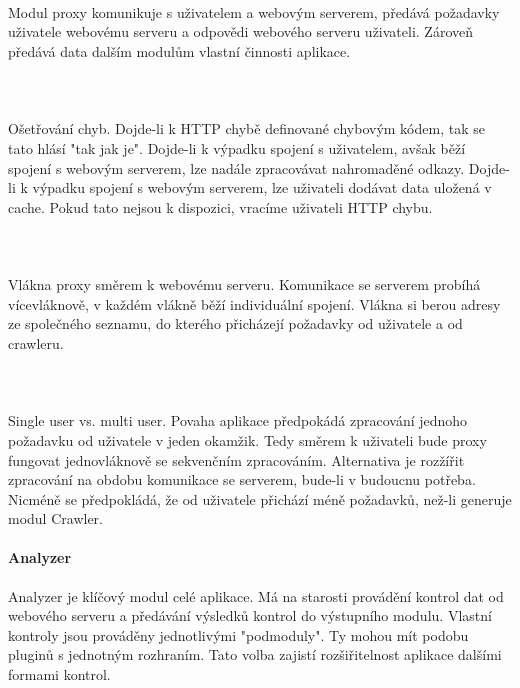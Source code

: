 \documentclass[10pt]{article}
\begin{document}
\paragraph{~} Modul proxy komunikuje s uživatelem a webovým  serverem, předává požadavky uživatele webovému serveru a odpovědi webového serveru uživateli. Zároveň předává data dalším modulům vlastní činnosti aplikace.
\paragraph{~}Ošetřování chyb. Dojde-li k HTTP chybě definované chybovým kódem, tak se tato hlásí "tak jak je". Dojde-li k výpadku spojení s uživatelem, avšak běží spojení s webovým serverem, lze nadále zpracovávat nahromaděné odkazy. Dojde-li k výpadku spojení s webovým serverem, lze uživateli dodávat data uložená v cache. Pokud tato nejsou k dispozici, vracíme uživateli HTTP chybu.
\paragraph{~}Vlákna proxy směrem k webovému serveru. Komunikace se serverem prob\'ih\'a v\'icevl\'aknov\v{e}, v ka\v{z}d\'em vl\'akn\v{e} b\v{e}\v{z}\'i individu\'aln\'i spojen\'i. Vl\'akna si berou adresy ze spole\v{c}n\'eho seznamu, do kter\'eho p\v{r}ich\'azej\'i po\v{z}adavky od u\v{z}ivatele a od crawleru.
\paragraph{~}Single user vs. multi user. Povaha aplikace p\v{r}edpok\'ad\'a zpracov\'an\'i jednoho po\v{z}adavku od u\v{z}ivatele v jeden okam\v{z}ik. Tedy sm\v{e}rem k u\v{z}ivateli bude proxy fungovat jednovl\'aknov\v{e} se sekven\v{c}n\'im zpracov\'an\'im. Alternativa je roz\v{z}\'i\v{r}it zpracov\'an\'i na obdobu komunikace se serverem, bude-li v budoucnu pot\v{r}eba. Nicm\'en\v{e} se p\v{r}edpokl\'ad\'a, \v{z}e od u\v{z}ivatele p\v{r}ich\'az\'i m\'en\v{e} po\v{z}adavk\r{u}, ne\v{z}-li generuje modul Crawler.
\paragraph{Analyzer} Analyzer je klíčový modul celé aplikace. Má na starosti provádění kontrol dat od webového serveru a předávání výsledků kontrol do výstupního modulu. Vlastní kontroly jsou prováděny jednotlivými "podmoduly". Ty mohou mít podobu pluginů s jednotným rozhraním. Tato volba zajistí rozšiřitelnost aplikace dalšími formami kontrol. 
\end{document}
